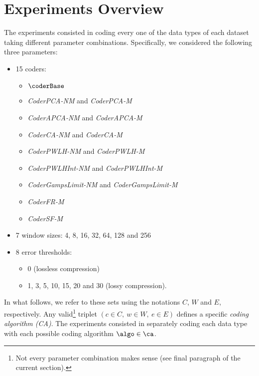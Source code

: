 \section{Experiments Overview}
\label{experiments:experiments}
The experiments consisted in coding every one of the data types of each dataset taking different parameter combinations. Specifically, we considered the following three parameters:
\vspace{-8pt}
\begin{itemize}
    \item 15 coders: 
        \vspace{-5pt}
        \begin{itemize}
            \item $\coderBase$
            \item \textit{CoderPCA-NM} and \textit{CoderPCA-M}
            \item \textit{CoderAPCA-NM} and \textit{CoderAPCA-M}
            \item \textit{CoderCA-NM} and \textit{CoderCA-M}
            \item \textit{CoderPWLH-NM} and \textit{CoderPWLH-M}
            \item \textit{CoderPWLHInt-NM} and \textit{CoderPWLHInt-M}
            \item \textit{CoderGampsLimit-NM} and \textit{CoderGampsLimit-M}
            \item \textit{CoderFR-M}
            \item \textit{CoderSF-M}
        \end{itemize}
    \item 7 window sizes: 4, 8, 16, 32, 64, 128 and 256
    \item 8 error thresholds: 
        \vspace{-5pt}
        \begin{itemize}
            \item 0 (lossless compression)
            \item 1, 3, 5, 10, 15, 20 and 30 (lossy compression).
        \end{itemize}
\end{itemize}

\vspace{+5pt}
\newcommand{\footvalid}{Not every parameter combination makes sense (see final paragraph of the current section).}
In what follows, we refer to these sets using the notations $C$, $W$ and $E$, respectively. Any valid\footnote{\footvalid} triplet $(c \in C, \ w \in W, \ e \in E)$ defines a specific \textit{coding algorithm (CA)}. The experiments consisted in separately coding each data type with each possible coding algorithm $\algo \in \ca$.


